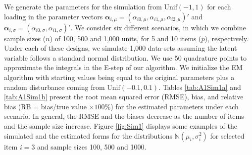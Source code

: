 \documentclass[11pt, a4paper]{article}
\newcommand{\N}{{\ensuremath{\mathbb{N}}}}
\begin{document}
We generate the parameters for the simulation from $\text{Unif}(-1,1)$ for each loading in the parameter vectors $\bm{\alpha}_{i,\mu} = (\alpha_{i0,\mu}, \alpha_{i1,\mu}, \alpha_{i2,\mu})'$ and $\bm{\alpha}_{i,\sigma} = (\alpha_{i0,\sigma}, \alpha_{i1,\sigma})'$. We consider six different scenarios, in which we combine sample sizes ($n$) of 100, 500 and 1,000 units, for 5 and 10 items ($p$), respectively. Under each of these designs, we simulate 1,000 data-sets assuming the latent variable follows a standard normal distribution.  We use 50 quadrature points to approximate the integrals in the E-step of our algorithm. We initialize the EM algorithm with starting values being equal to the original parameters plus a random disturbance coming from $\text{Unif}(-0.1,0.1)$. Tables \ref{tab:A1Sim1a} and \ref{tab:A1Sim1b} present the root mean squared error (RMSE), bias, and relative bias (RB = bias/true value $\times 100\%$) for the estimated parameters under each scenario. In general, the RMSE and the biases decrease as the number of items and the sample size increase. Figure \ref{fig:Sim1} displays some examples of the simulated and the estimated forms for the distributions $\N(\mu_{i}, \sigma^2_{i})$ for selected item $i = 3$ and sample sizes 100, 500 and 1000.
\end{document}
